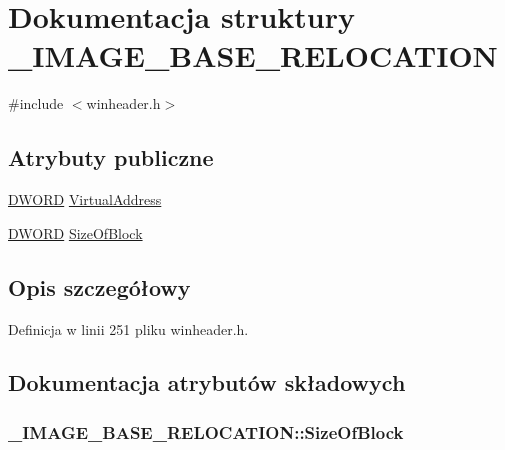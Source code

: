 \hypertarget{struct___i_m_a_g_e___b_a_s_e___r_e_l_o_c_a_t_i_o_n}{\section{Dokumentacja struktury \-\_\-\-I\-M\-A\-G\-E\-\_\-\-B\-A\-S\-E\-\_\-\-R\-E\-L\-O\-C\-A\-T\-I\-O\-N}
\label{struct___i_m_a_g_e___b_a_s_e___r_e_l_o_c_a_t_i_o_n}
}


{\ttfamily \#include $<$winheader.\-h$>$}

\subsection*{Atrybuty publiczne}
\begin{DoxyCompactItemize}
\item 
\hyperlink{winheader_8h_af483253b2143078cede883fc3c111ad2}{D\-W\-O\-R\-D} \hyperlink{struct___i_m_a_g_e___b_a_s_e___r_e_l_o_c_a_t_i_o_n_aa9cd235a62c0b36e0b9f7051be3c5dcb}{Virtual\-Address}
\item 
\hyperlink{winheader_8h_af483253b2143078cede883fc3c111ad2}{D\-W\-O\-R\-D} \hyperlink{struct___i_m_a_g_e___b_a_s_e___r_e_l_o_c_a_t_i_o_n_a81d20c4bdef7268e328159bbc56e2d76}{Size\-Of\-Block}
\end{DoxyCompactItemize}


\subsection{Opis szczegółowy}


Definicja w linii 251 pliku winheader.\-h.



\subsection{Dokumentacja atrybutów składowych}
\hypertarget{struct___i_m_a_g_e___b_a_s_e___r_e_l_o_c_a_t_i_o_n_a81d20c4bdef7268e328159bbc56e2d76}{
\subsubsection[{Size\-Of\-Block}]{ \-\_\-\-I\-M\-A\-G\-E\-\_\-\-B\-A\-S\-E\-\_\-\-R\-E\-L\-O\-C\-A\-T\-I\-O\-N\-::\-Size\-Of\-Block}}\label{struct___i_m_a_g_e___b_a_s_e___r_e_l_o_c_a_t_i_o_n_a81d20c4bdef7268e328159bbc56e2d76}


